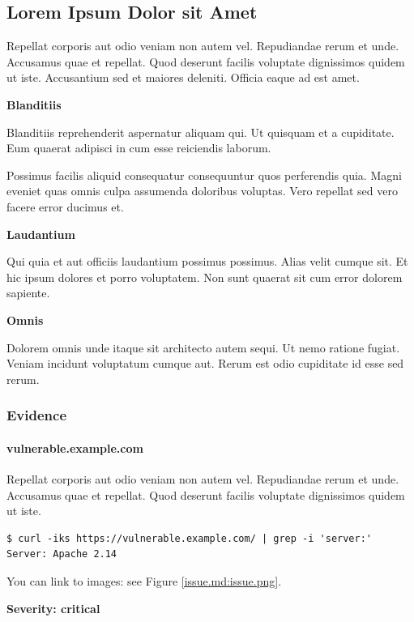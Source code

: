\documentclass[a4paper]{article}
\begin{document}
    \subsection{Lorem Ipsum Dolor sit Amet}
    \label{issue.md}

    Repellat corporis aut odio veniam non autem vel.
Repudiandae rerum et unde. Accusamus quae et repellat.
Quod deserunt facilis voluptate dignissimos quidem ut iste.
Accusantium sed et maiores deleniti.
Officia eaque ad est amet.

\textbf{Blanditiis}

Blanditiis reprehenderit aspernatur aliquam qui.
Ut quisquam et a cupiditate.
Eum quaerat adipisci in cum esse reiciendis laborum.

Possimus facilis aliquid consequatur consequuntur quos perferendis quia.
Magni eveniet quas omnis culpa assumenda doloribus voluptas.
Vero repellat sed vero facere error ducimus et.

\textbf{Laudantium}

Qui quia et aut officiis laudantium possimus possimus.
Alias velit cumque sit.
Et hic ipsum dolores et porro voluptatem.
Non sunt quaerat sit cum error dolorem sapiente.

\textbf{Omnis}

Dolorem omnis unde itaque sit architecto autem sequi.
Ut nemo ratione fugiat.
Veniam incidunt voluptatum cumque aut.
Rerum est odio cupiditate id esse sed rerum.


    \subsubsection{Evidence}

          \paragraph{vulnerable.example.com}

      Repellat corporis aut odio veniam non autem vel.
Repudiandae rerum et unde. Accusamus quae et repellat.
Quod deserunt facilis voluptate dignissimos quidem ut iste.

\begin{lstlisting}
$ curl -iks https://vulnerable.example.com/ | grep -i 'server:'
Server: Apache 2.14
\end{lstlisting}

You can link to images: see Figure \ref{issue.md:issue.png}.

\textbf{Severity: critical}
\end{document}
